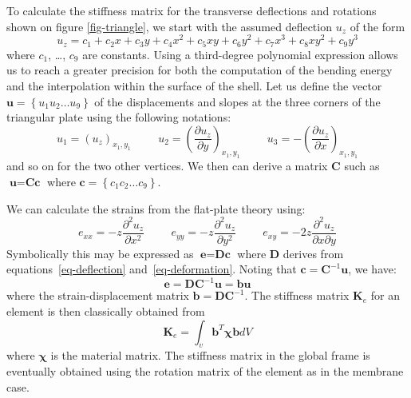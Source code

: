 \documentclass{llncs}
\begin{document}
To calculate the stiffness matrix for the transverse deflections and rotations shown on figure \ref{fig-triangle}, we start with the assumed deflection $u_z$ of the form
\begin{equation}
 u_z = c_1 + c_2x + c_3y + c_4x^2 + c_5xy + c_6y^2 + c_7x^3 + c_8xy^2 + c_9y^3
\label{eq-deflection}
\end{equation} 
where $c_1$, \ldots , $c_9$ are constants. Using a third-degree polynomial expression allows us to reach a greater precision for both the computation of the bending energy and the interpolation within the surface of the shell. Let us define the vector $\textbf{u} = \left\{u_1 u_2 \ldots u_9 \right\} $ of the displacements and slopes at the three corners of the triangular plate using the following notations:
\begin{equation}
u_1 = (u_z)_{x_1,y_1} \hspace{1cm} u_2 = \left(\frac{\partial u_z}{\partial y}\right)_{x_1,y_1} \hspace{1cm} u_3 = - \left(\frac{\partial u_z}{\partial x}\right)_{x_1,y_1}
\end{equation} 
and so on for the two other vertices.
We then can derive a matrix $\textbf{C}$ such as $\textbf{u} = \textbf{Cc}$ where $\textbf{c} = \left\{c_1 c_2 \ldots c_9 \right\} $.

We can calculate the strains from the flat-plate theory using:
\begin{equation}
\label{eq-deformation}
e_{xx} = -z \frac{\partial^2u_z}{\partial x^2}
\hspace{1cm}
e_{yy} = -z \frac{\partial^2u_z}{\partial y^2}
\hspace{1cm}
e_{xy} = -2z \frac{\partial^2u_z}{\partial x \partial y}
\end{equation} 
Symbolically this may be expressed as $\textbf{e} = \textbf{Dc}$ where $\textbf{D}$ derives from equations~\ref{eq-deflection} and~\ref{eq-deformation}. Noting that $\textbf{c} = \textbf{C}^{-1}\textbf{u}$, we have:
\begin{equation}
\textbf{e} = \textbf{DC}^{-1}\textbf{u} = \textbf{bu}
\end{equation} 
where the strain-displacement matrix $\textbf{b} = \textbf{DC}^{-1}$. 
The stiffness matrix $\textbf{K}_e$ for an element is then classically obtained from
\begin{equation}
\textbf{K}_e = \int_v \textbf{b}^{T} \boldsymbol\chi \textbf{b} dV
\end{equation} 
where $\boldsymbol\chi$ is the material matrix. The stiffness matrix in the global frame is eventually obtained using the rotation matrix of the element as in the membrane case. 
\end{document}
